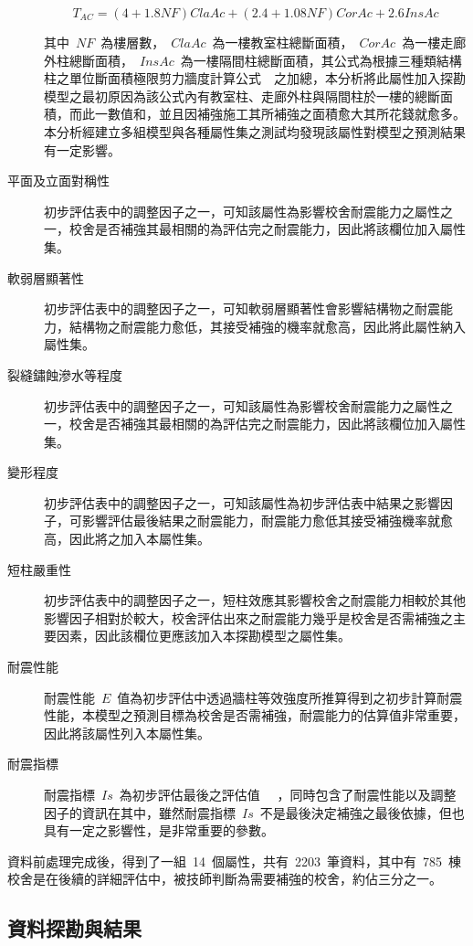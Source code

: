 \begin{description}
  \begin{equation}T_{AC} = (4+1.8NF) ClaAc+(2.4+1.08NF) CorAc+2.6 InsAc \end{equation} 

  其中~$NF$~為樓層數，~$ClaAc$~為一樓教室柱總斷面積，~$CorAc$~為一樓走廊外柱總斷面積，~$InsAc$~為一樓隔間柱總斷面積，其公式為根據三種類結構柱之單位斷面積極限剪力牆度計算公式~\cite{su2008master}~之加總，本分析將此屬性加入探勘模型之最初原因為該公式內有教室柱、走廊外柱與隔間柱於一樓的總斷面積，而此一數值和，並且因補強施工其所補強之面積愈大其所花錢就愈多。本分析經建立多組模型與各種屬性集之測試均發現該屬性對模型之預測結果有一定影響。
\item [平面及立面對稱性]
初步評估表中的調整因子之一，可知該屬性為影響校舍耐震能力之屬性之一，校舍是否補強其最相關的為評估完之耐震能力，因此將該欄位加入屬性集。
\item [軟弱層顯著性]
初步評估表中的調整因子之一，可知軟弱層顯著性會影響結構物之耐震能力，結構物之耐震能力愈低，其接受補強的機率就愈高，因此將此屬性納入屬性集。
\item [裂縫鏽蝕滲水等程度]
初步評估表中的調整因子之一，可知該屬性為影響校舍耐震能力之屬性之一，校舍是否補強其最相關的為評估完之耐震能力，因此將該欄位加入屬性集。
\item [變形程度]
初步評估表中的調整因子之一，可知該屬性為初步評估表中結果之影響因子，可影響評估最後結果之耐震能力，耐震能力愈低其接受補強機率就愈高，因此將之加入本屬性集。
\item [短柱嚴重性]
初步評估表中的調整因子之一，短柱效應其影響校舍之耐震能力相較於其他影響因子相對於較大，校舍評估出來之耐震能力幾乎是校舍是否需補強之主要因素，因此該欄位更應該加入本探勘模型之屬性集。
\item [耐震性能]
耐震性能~$E$~值為初步評估中透過牆柱等效強度所推算得到之初步計算耐震性能，本模型之預測目標為校舍是否需補強，耐震能力的估算值非常重要，因此將該屬性列入本屬性集。
\item [耐震指標]
耐震指標~$Is$~為初步評估最後之評估值~\cite{ncree03049} ~，同時包含了耐震性能以及調整因子的資訊在其中，雖然耐震指標~$Is$~不是最後決定補強之最後依據，但也具有一定之影響性，是非常重要的參數。
\end{description}

資料前處理完成後，得到了一組~14~個屬性，共有~2203~筆資料，其中有~785~棟校舍是在後續的詳細評估中，被技師判斷為需要補強的校舍，約佔三分之一。

\subsection{資料探勘與結果}

